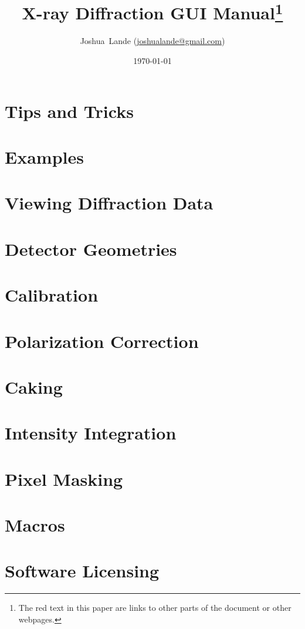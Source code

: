\documentclass[12pt]{book}
\begin{document}
\title{X-ray Diffraction GUI Manual\footnote{The red text in this paper are links to other parts of the document or other webpages.}}
\date{\today}
\author{Joshua~Lande (\href{mailto:joshualande@gmail.com}{joshualande@gmail.com})}
\maketitle

\tableofcontents

\chapter{Tips and Tricks}


\chapter{Examples}


\chapter{Viewing Diffraction Data}

\chapter{Detector Geometries}


\chapter{Calibration}
\label{calibration}


\chapter{Polarization Correction}

\chapter{Caking}
\label{Caking}


\chapter{Intensity Integration}


\chapter{Pixel Masking}


\chapter{Macros}


\chapter{Software Licensing}



 

\printindex
\end{document}

